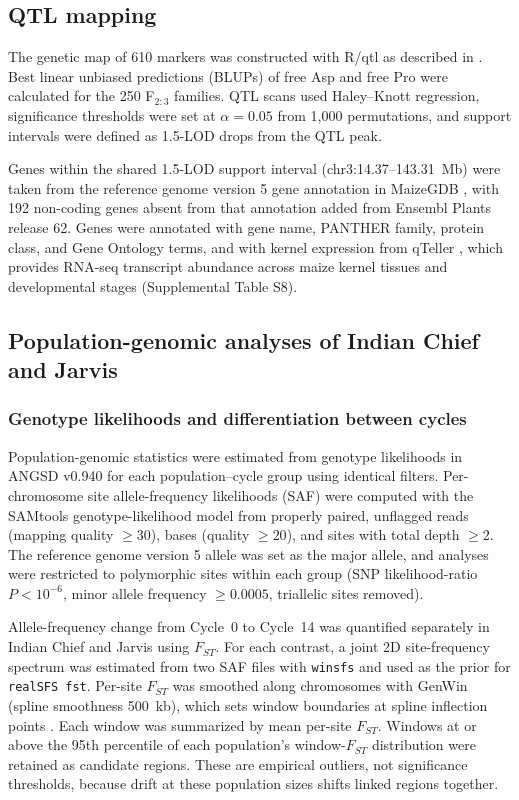 \documentclass[namedate,unnumsec,webpdf,contemporary,large]{oup-authoring-template}
\begin{document}
\subsection{QTL mapping}
The genetic map of 610 markers was constructed with R/qtl \citep{Broman2003} as described in \citet{Fitzsimmons2026KernelKitchen}. Best linear unbiased predictions (BLUPs) of free Asp and free Pro were calculated for the 250 F$_{2:3}$ families. QTL scans used Haley--Knott regression, significance thresholds were set at $\alpha = 0.05$ from 1,000 permutations, and support intervals were defined as 1.5-LOD drops from the QTL peak.

Genes within the shared 1.5-LOD support interval (chr3:14.37--143.31~Mb) were taken from the reference genome version 5 gene annotation in MaizeGDB \citep{MaizeGDB}, with 192 non-coding genes absent from that annotation added from Ensembl Plants release 62. Genes were annotated with gene name, PANTHER family, protein class, and Gene Ontology terms, and with kernel expression from qTeller \citep{qteller}, which provides RNA-seq transcript abundance across maize kernel tissues and developmental stages (Supplemental Table S8).

\subsection{Population-genomic analyses of Indian Chief and Jarvis}

\subsubsection{Genotype likelihoods and differentiation between cycles}

Population-genomic statistics were estimated from genotype likelihoods in ANGSD v0.940 \citep{Korneliussen2014ANGSD} for each population–cycle group using identical filters. Per-chromosome site allele-frequency likelihoods (SAF) were computed with the SAMtools genotype-likelihood model from properly paired, unflagged reads (mapping quality $\ge 30$), bases (quality $\ge 20$), and sites with total depth $\ge 2$. The reference genome version 5 allele was set as the major allele, and analyses were restricted to polymorphic sites within each group (SNP likelihood-ratio $P < 10^{-6}$, minor allele frequency $\ge 0.0005$, triallelic sites removed).

Allele-frequency change from Cycle~0 to Cycle~14 was quantified separately in Indian Chief and Jarvis using $F_{ST}$. For each contrast, a joint 2D site-frequency spectrum was estimated from two SAF files with \texttt{winsfs} \citep{Rasmussen2022winsfs} and used as the prior for \texttt{realSFS fst}. Per-site $F_{ST}$ was smoothed along chromosomes with GenWin (spline smoothness 500~kb), which sets window boundaries at spline inflection points \citep{Beissinger2015GenWin}. Each window was summarized by mean per-site $F_{ST}$. Windows at or above the 95th percentile of each population’s window-$F_{ST}$ distribution were retained as candidate regions. These are empirical outliers, not significance thresholds, because drift at these population sizes shifts linked regions together.
\end{document}
